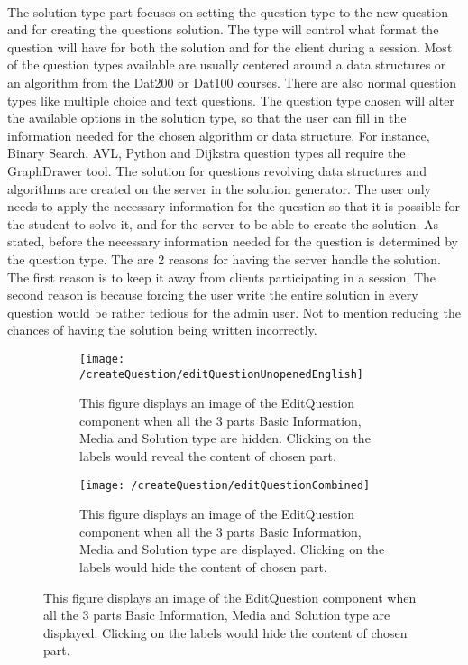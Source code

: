 \\[11pt]
The solution type part focuses on setting the question type to the new question and for creating the questions solution. The type will control what format the question will have for both the solution and for the client during a session. Most of the question types available are usually centered around a data structures or an algorithm from the Dat200 or Dat100 courses. There are also normal question types like multiple choice and text questions. The question type chosen will alter the available options in the solution type, so that the user can fill in the information needed for the chosen algorithm or data structure. For instance, Binary Search, AVL, Python and Dijkstra question types all require the GraphDrawer tool. The solution for questions revolving data structures and algorithms are created on the server in the solution generator. The user only needs to apply the necessary information for the question so that it is possible for the student to solve it, and for the server to be able to create the solution. As stated, before the necessary information needed for the question is determined by the question type. The are 2 reasons for having the server handle the solution. The first reason is to keep it away from clients participating in a session. The second reason is because forcing the user write the entire solution in every question would be rather tedious for the admin user. Not to mention reducing the chances of having the solution being written incorrectly.
\begin{figure}[H]
	\centering
	\begin{subfigure}{0.70\linewidth}
		\texttt{[image: /createQuestion/editQuestionUnopenedEnglish]}
		\caption{This figure displays an image of the EditQuestion component when all the 3 parts Basic Information, Media and Solution type are hidden. Clicking on the labels would reveal the content of chosen part.}
		\label{fig:editquestionUnopened}
	\end{subfigure}
	\begin{subfigure}{0.70\linewidth}
		\texttt{[image: /createQuestion/editQuestionCombined]}
		\caption{This figure displays an image of the EditQuestion component when all the 3 parts Basic Information, Media and Solution type are displayed. Clicking on the labels would hide the content of chosen part.}
		\label{fig:editquestionOpened}
	\end{subfigure}
\end{figure}
\noindent

